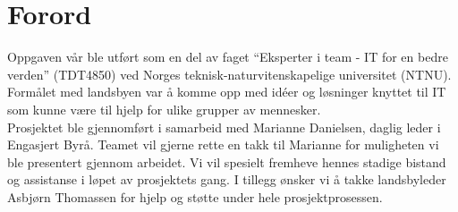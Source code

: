 \chapter*{Forord}
Oppgaven vår ble utført som en del av faget ``Eksperter i team - IT for en bedre verden''
(TDT4850) ved Norges teknisk-naturvitenskapelige universitet (NTNU).
Formålet med landsbyen var å komme opp med idéer og løsninger knyttet til
IT som kunne være til hjelp for ulike grupper av mennesker.\\

Prosjektet ble gjennomført i samarbeid med Marianne Danielsen, daglig leder i Engasjert Byrå.
Teamet vil gjerne rette en takk til Marianne for muligheten vi ble presentert gjennom arbeidet.
Vi vil spesielt fremheve hennes stadige bistand og assistanse i løpet av prosjektets gang.
I tillegg ønsker vi å takke landsbyleder Asbjørn Thomassen for hjelp og støtte under
hele prosjektprosessen.
